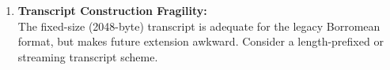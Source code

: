 \documentclass[12pt,a4paper]{article}
\begin{document}
\begin{enumerate}

  \item \textbf{Transcript Construction Fragility:}\\
        The fixed-size (2048-byte) transcript is adequate for the
        legacy Borromean format, but makes future extension awkward.
        Consider a length-prefixed or streaming transcript scheme.



\end{enumerate}
\end{document}
